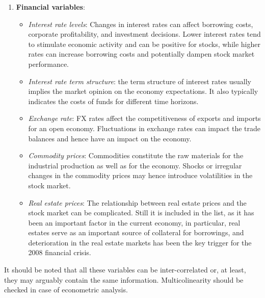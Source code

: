\begin{enumerate}
\begin{itemize}
	\end{itemize}
	\item \textbf{Financial variables}: 
	\begin{itemize}
		\item \textit{Interest rate levels}: Changes in interest rates can affect borrowing costs, corporate profitability, and investment decisions. Lower interest rates tend to stimulate economic activity and can be positive for stocks, while higher rates can increase borrowing costs and potentially dampen stock market performance.
		\item \textit{Interest rate term structure}: the term structure of interest rates usually implies the market opinion on the economy expectations. It also typically indicates the costs of funds for different time horizons. 
		\item \textit{Exchange rate}: FX rates affect the competitiveness of exports and imports for an open economy. Fluctuations in exchange rates can impact the trade balances and hence have an impact on the economy.
		\item \textit{Commodity prices}: Commodities constitute the raw materials for the industrial production as well as for the economy. Shocks or irregular changes in the commodity prices may hence introduce volatilities in the stock market. 
		\item \textit{Real estate prices}: The relationship between real estate prices and the stock market can be complicated. Still it is included in the list, as it has been an important factor in the current economy, in particular, real estates serve as an important source of collateral for borrowings, and deterioration in the real estate markets has been the key trigger for the 2008 financial crisis. 
	\end{itemize}
\end{enumerate}

It should be noted that all these variables can be inter-correlated or, at least, they may arguably contain the same information. Multicolinearity should be checked in case of econometric analysis. 

